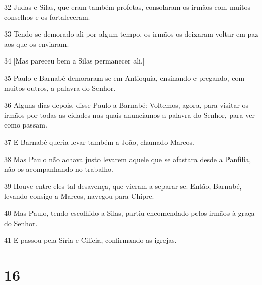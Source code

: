 \par 32 Judas e Silas, que eram também profetas, consolaram os irmãos com muitos conselhos e os fortaleceram.
\par 33 Tendo-se demorado ali por algum tempo, os irmãos os deixaram voltar em paz aos que os enviaram.
\par 34 [Mas pareceu bem a Silas permanecer ali.]
\par 35 Paulo e Barnabé demoraram-se em Antioquia, ensinando e pregando, com muitos outros, a palavra do Senhor.
\par 36 Alguns dias depois, disse Paulo a Barnabé: Voltemos, agora, para visitar os irmãos por todas as cidades nas quais anunciamos a palavra do Senhor, para ver como passam.
\par 37 E Barnabé queria levar também a João, chamado Marcos.
\par 38 Mas Paulo não achava justo levarem aquele que se afastara desde a Panfília, não os acompanhando no trabalho.
\par 39 Houve entre eles tal desavença, que vieram a separar-se. Então, Barnabé, levando consigo a Marcos, navegou para Chipre.
\par 40 Mas Paulo, tendo escolhido a Silas, partiu encomendado pelos irmãos à graça do Senhor.
\par 41 E passou pela Síria e Cilícia, confirmando as igrejas.

\chapter{16}


